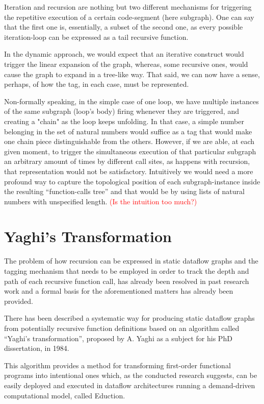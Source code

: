 \documentclass[ack,preface]{dithesis}
\begin{document}
Iteration and recursion are nothing but two different mechanisms for triggering the repetitive execution of a certain code-segment (here subgraph). One can say that the first one is, essentially, a subset of the second one, as every possible iteration-loop can be expressed as a tail recursive function. 

In the dynamic approach, we would expect that an iterative construct would trigger the linear expansion of the graph, whereas, some recursive ones, would cause the graph to expand in a tree-like way. That said, we can now have a sense, perhaps, of how the tag, in each case, must be represented. 

Non-formally speaking, in the simple case of one  loop, we have multiple instances of the same subgraph (loop’s body) firing whenever they are triggered, and creating a "chain" as the loop keeps unfolding. In that case, a simple number belonging in the set of natural numbers would suffice as a tag that would make one chain piece distinguishable from the others. However, if we are able, at each given moment, to trigger the simultaneous execution of that particular subgraph an arbitrary amount of times by different call sites, as happens with recursion, that representation would not be satisfactory. Intuitively we would need a more profound way to capture the topological position of each subgraph-instance inside the resulting “function-calls tree” and that would be by using lists of natural numbers with unspecified length. \textcolor{red}{(Is the intuition too much?)}


    \section{Yaghi's Transformation}

The problem of how recursion can be expressed in static dataflow graphs and the tagging mechanism that needs to be employed in order to track the depth and path of each recursive function call, has already been resolved in past research work and a formal basis for the aforementioned matters has already been provided.  \cite{Rondogiannis:1997}

There has been described a systematic way for producing static dataflow graphs from potentially recursive function definitions based on an algorithm called “Yaghi’s transformation”, proposed by A. Yaghi as a subject for his PhD dissertation, in 1984.

This algorithm provides a method for transforming first-order functional programs into intentional ones which, as the conducted research suggests, can be easily deployed and executed in dataflow architectures running a demand-driven computational model, called Eduction.
\end{document}
